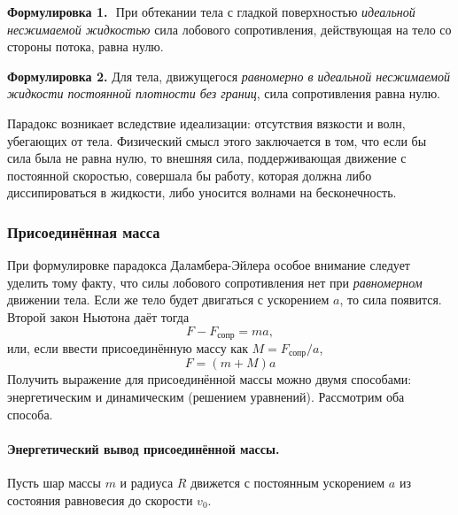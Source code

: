 \textbf{Формулировка 1.\,\, }{При обтекании тела с гладкой поверхностью \textit{идеальной несжимаемой
    жидкостью} сила лобового сопротивления, действующая на тело со
стороны потока, равна нулю.}


\textbf{Формулировка 2. }{Для тела, движущегося \textit{равномерно в идеальной несжимаемой
    жидкости постоянной плотности без границ}, сила сопротивления
равна нулю.}

\vspace{0.5em}
Парадокс возникает вследствие идеализации: отсутствия вязкости и волн, убегающих от тела. Физический смысл этого заключается в том, что если бы сила была не равна нулю, то внешняя сила, поддерживающая
движение с постоянной скоростью, совершала бы работу, которая должна либо
диссипироваться в жидкости, либо уносится волнами на бесконечность.


\subsubsection{Присоединённая масса}

При формулировке парадокса Даламбера-Эйлера особое внимание следует уделить тому факту, что силы лобового сопротивления нет при \textit{равномерном} движении тела. Если же тело будет двигаться с ускорением $a$, то сила появится. Второй закон Ньютона даёт тогда
\begin{equation}
	F-F_\text{сопр} = ma,
\end{equation}
или, если ввести присоединённую массу как $M = F_\text{сопр}/a$,
\begin{equation}
	F = (m+M)a
\end{equation}
Получить выражение для присоединённой массы можно двумя способами: энергетическим и динамическим (решением уравнений). Рассмотрим оба способа.

\paragraph{Энергетический вывод присоединённой массы. } Пусть шар массы 
$m$ и радиуса $R$ движется с постоянным ускорением $a$ из состояния 
равновесия до скорости $v_0$.

